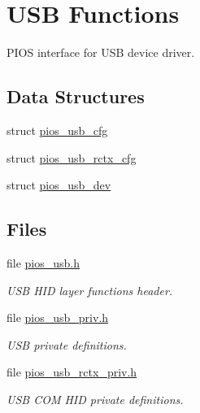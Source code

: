 \hypertarget{group___p_i_o_s___u_s_b}{\section{\-U\-S\-B \-Functions}
\label{group___p_i_o_s___u_s_b}
}


\-P\-I\-O\-S interface for \-U\-S\-B device driver.  


\subsection*{\-Data \-Structures}
\begin{DoxyCompactItemize}
\item 
struct \hyperlink{structpios__usb__cfg}{pios\-\_\-usb\-\_\-cfg}
\item 
struct \hyperlink{structpios__usb__rctx__cfg}{pios\-\_\-usb\-\_\-rctx\-\_\-cfg}
\item 
struct \hyperlink{structpios__usb__dev}{pios\-\_\-usb\-\_\-dev}
\end{DoxyCompactItemize}
\subsection*{\-Files}
\begin{DoxyCompactItemize}
\item 
file \hyperlink{pios__usb_8h}{pios\-\_\-usb.\-h}
\begin{DoxyCompactList}\small\item\em \-U\-S\-B \-H\-I\-D layer functions header. \end{DoxyCompactList}\item 
file \hyperlink{pios__usb__priv_8h}{pios\-\_\-usb\-\_\-priv.\-h}
\begin{DoxyCompactList}\small\item\em \-U\-S\-B private definitions. \end{DoxyCompactList}\item 
file \hyperlink{pios__usb__rctx__priv_8h}{pios\-\_\-usb\-\_\-rctx\-\_\-priv.\-h}
\begin{DoxyCompactList}\small\item\em \-U\-S\-B \-C\-O\-M \-H\-I\-D private definitions. \end{DoxyCompactList}\end{DoxyCompactItemize}
